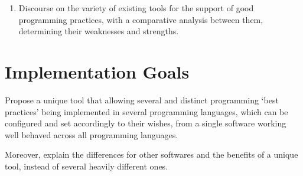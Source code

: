 \begin{englishtext}
\begin{enumerate}
        \item Discourse on the variety of existing tools for the support of good
        programming practices, with a comparative analysis between them,
        determining their weaknesses and strengths.

    \end{enumerate}



    \section{Implementation Goals}

    Propose a unique tool that allowing several and distinct
    programming `best practices' being implemented in several programming
    languages, which can be configured and set accordingly to their wishes,
    from a single software working well behaved across all programming languages.

    Moreover, explain the differences for other softwares and the benefits
    of a unique tool, instead of several heavily different ones.


\begin{comment}
    1.2      Rascunho da Monografia para TCC1

    1.2.1    * Introdução       Uma breve descrição dos objetivos e da
               justificativa para realização do projeto. Uma breve explicação de
               qual a necessidade e importância deste projeto no escopo da
               Ciência da Computação. Os objetivo gerais e específicos buscados
               após a conclusão e análise deste projeto.

    1.2.2    * Bibliográfia     Fazer uma análise do estado da arte em relação
             ao que existe hoje em dia de cunho científico, comentando sobre os
             diversos trabalhos na área de beautifying.

    1.2.3    * Classificações   Escrever sobre quais são os tipos possíveis de
             beautifying. Quais são as técnicas mais eficientes, para quais
             linguagens ele se aplicam.

    Cronograma:

    Id      Atividade                               Data início    Data fim
    1.2.2.a Escrever sobre os Formatadores Atuais   31/07/2017     30/08/2017
    1.2.2.b Escrever sobre as Pesquisas Atuais      01/09/2017     15/09/2017
    1.2.3.a Escrever as Classes de Beautifying      16/09/2017     30/09/2017
    1.2.3.b Escrever os Tipos de Beautifying        01/10/2017     30/10/2017
    1.2.4.a Fazer a Revisão do Texto Escrito        31/10/2017     20/11/2017
\end{comment}



\end{englishtext}




